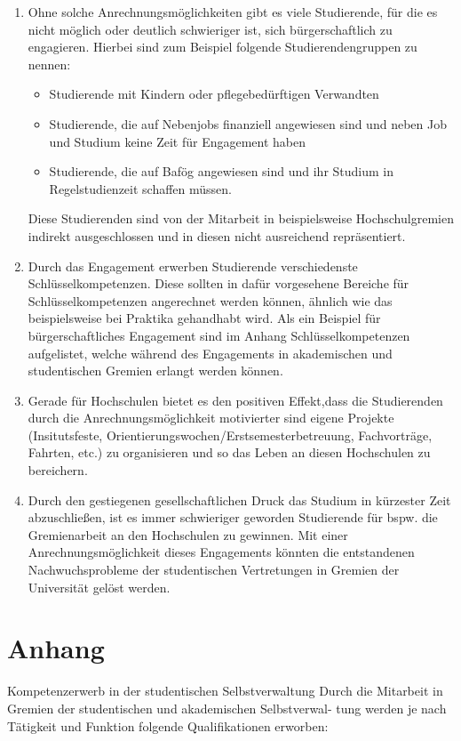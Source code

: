 \documentclass[DIV=calc]{scrartcl}
\begin{document}
\begin{enumerate}
\item Ohne solche Anrechnungsmöglichkeiten gibt es viele Studierende, für die es nicht möglich oder deutlich schwieriger ist, sich bürgerschaftlich zu engagieren. Hierbei sind zum Beispiel folgende Studierendengruppen zu nennen:
\begin{itemize}
    \item Studierende mit Kindern oder pflegebedürftigen Verwandten
    \item Studierende, die auf Nebenjobs finanziell angewiesen sind und neben Job und Studium keine Zeit für Engagement haben
    \item Studierende, die auf Bafög angewiesen sind und ihr Studium in Regelstudienzeit schaffen müssen.
\end{itemize}
    Diese Studierenden sind von der Mitarbeit in beispielsweise Hochschulgremien indirekt ausgeschlossen und in diesen nicht ausreichend repräsentiert.
\item Durch das Engagement erwerben Studierende verschiedenste Schlüsselkompetenzen. Diese sollten in dafür vorgesehene Bereiche für Schlüsselkompetenzen angerechnet werden können, ähnlich wie das beispielsweise bei Praktika gehandhabt wird. Als ein Beispiel für bürgerschaftliches Engagement sind im Anhang Schlüsselkompetenzen aufgelistet, welche während des Engagements in akademischen und studentischen Gremien erlangt werden können.
\item Gerade für Hochschulen bietet es den positiven Effekt,dass die Studierenden durch die Anrechnungsmöglichkeit motivierter sind eigene Projekte (Insitutsfeste, Orientierungswochen/Erstsemesterbetreuung, Fachvorträge, Fahrten, etc.) zu organisieren und so das Leben an diesen Hochschulen zu bereichern.
\item Durch den gestiegenen gesellschaftlichen Druck das Studium in kürzester Zeit abzuschließen, ist es immer schwieriger geworden Studierende für bspw. die Gremienarbeit an den Hochschulen zu gewinnen. Mit einer Anrechnungsmöglichkeit dieses Engagements könnten die entstandenen Nachwuchsprobleme der studentischen Vertretungen in Gremien der Universität gelöst werden.
\end{enumerate}
\newpage
\section*{Anhang}
Kompetenzerwerb in der studentischen Selbstverwaltung
Durch die Mitarbeit in Gremien der studentischen und akademischen Selbstverwal- tung werden je nach Tätigkeit und Funktion folgende Qualifikationen erworben:
\end{document}
